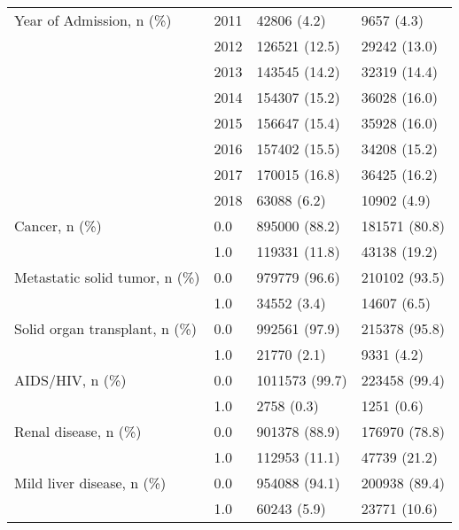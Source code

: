 \begin{tabular}{llll}
Year of Admission, n (\%) & 2011 &                    42806 (4.2) &        9657 (4.3) \\
                                       & 2012 &                  126521 (12.5) &      29242 (13.0) \\
                                       & 2013 &                  143545 (14.2) &      32319 (14.4) \\
                                       & 2014 &                  154307 (15.2) &      36028 (16.0) \\
                                       & 2015 &                  156647 (15.4) &      35928 (16.0) \\
                                       & 2016 &                  157402 (15.5) &      34208 (15.2) \\
                                       & 2017 &                  170015 (16.8) &      36425 (16.2) \\
                                       & 2018 &                    63088 (6.2) &       10902 (4.9) \\
Cancer, n (\%) & 0.0 &                  895000 (88.2) &     181571 (80.8) \\
                                       & 1.0 &                  119331 (11.8) &      43138 (19.2) \\
Metastatic solid tumor, n (\%) & 0.0 &                  979779 (96.6) &     210102 (93.5) \\
                                       & 1.0 &                    34552 (3.4) &       14607 (6.5) \\
Solid organ transplant, n (\%) & 0.0 &                  992561 (97.9) &     215378 (95.8) \\
                                       & 1.0 &                    21770 (2.1) &        9331 (4.2) \\
AIDS/HIV, n (\%) & 0.0 &                 1011573 (99.7) &     223458 (99.4) \\
                                       & 1.0 &                     2758 (0.3) &        1251 (0.6) \\
Renal disease, n (\%) & 0.0 &                  901378 (88.9) &     176970 (78.8) \\
                                       & 1.0 &                  112953 (11.1) &      47739 (21.2) \\
Mild liver disease, n (\%) & 0.0 &                  954088 (94.1) &     200938 (89.4) \\
                                       & 1.0 &                    60243 (5.9) &      23771 (10.6) \\

\end{tabular}
